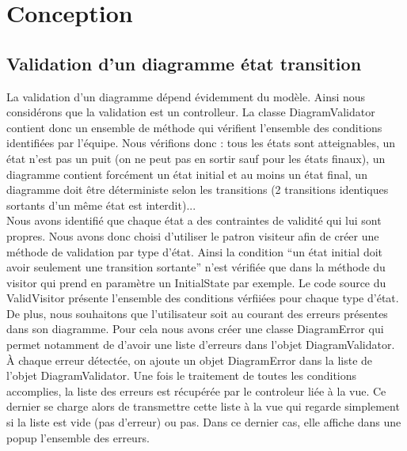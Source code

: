 \section{Conception}



\subsection{Validation d'un diagramme état transition}
La validation d'un diagramme dépend évidemment du modèle. Ainsi nous considérons que la validation est un controlleur. La classe DiagramValidator contient donc un ensemble de méthode qui vérifient l'ensemble des conditions identifiées par l'équipe. Nous vérifions donc : tous les états sont atteignables, un état n'est pas un puit (on ne peut pas en sortir sauf pour les états finaux), un diagramme contient forcément un état initial et au moins un état final, un diagramme doit être déterministe selon les transitions (2 transitions identiques sortants d'un même état est interdit)... \\
Nous avons identifié que chaque état a des contraintes de validité qui lui sont propres. Nous avons donc choisi d'utiliser le patron visiteur afin de créer une méthode de validation par type d'état. Ainsi la condition ``un état initial doit avoir seulement une transition sortante'' n'est vérifiée que dans la méthode du visitor qui prend en paramètre un InitialState par exemple. Le code source du ValidVisitor présente l'ensemble des conditions vérfiiées pour chaque type d'état. \\
De plus, nous souhaitons que l'utilisateur soit au courant des erreurs présentes dans son diagramme. Pour cela nous avons créer une classe DiagramError qui permet notamment de d'avoir une liste d'erreurs dans l'objet DiagramValidator. À chaque erreur détectée, on ajoute un objet DiagramError dans la liste de l'objet DiagramValidator. Une fois le traitement de toutes les conditions accomplies, la liste des erreurs est récupérée par le controleur liée à la vue. Ce dernier se charge alors de transmettre cette liste à la vue qui regarde simplement si la liste est vide (pas d'erreur) ou pas. Dans ce dernier cas, elle affiche dans une popup l'ensemble des erreurs.

\newpage